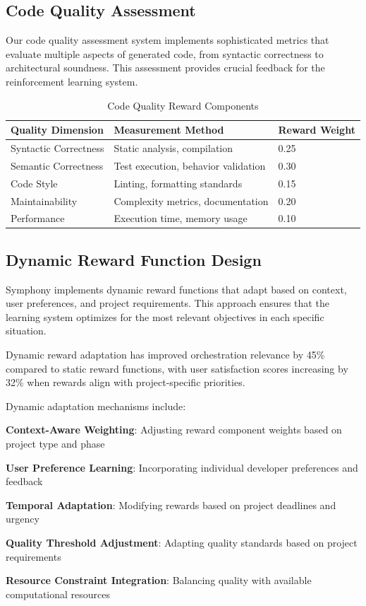 \subsection*{Code Quality Assessment}

Our code quality assessment system implements sophisticated metrics that evaluate multiple aspects of generated code, from syntactic correctness to architectural soundness. This assessment provides crucial feedback for the reinforcement learning system.

\begin{table}[ht]
\centering
\begin{tabular}{@{}lll@{}}
\toprule
\textbf{Quality Dimension} & \textbf{Measurement Method} & \textbf{Reward Weight} \\
\midrule
Syntactic Correctness & Static analysis, compilation & 0.25 \\
Semantic Correctness & Test execution, behavior validation & 0.30 \\
Code Style & Linting, formatting standards & 0.15 \\
Maintainability & Complexity metrics, documentation & 0.20 \\
Performance & Execution time, memory usage & 0.10 \\
\bottomrule
\end{tabular}
\caption{Code Quality Reward Components}
\end{table}

\subsection*{Dynamic Reward Function Design}

Symphony implements dynamic reward functions that adapt based on context, user preferences, and project requirements. This approach ensures that the learning system optimizes for the most relevant objectives in each specific situation.

\begin{alertbox}
Dynamic reward adaptation has improved orchestration relevance by 45\% compared to static reward functions, with user satisfaction scores increasing by 32\% when rewards align with project-specific priorities.
\end{alertbox}

Dynamic adaptation mechanisms include:

\begin{expandedlist}
    \item \textbf{Context-Aware Weighting}: Adjusting reward component weights based on project type and phase
    \item \textbf{User Preference Learning}: Incorporating individual developer preferences and feedback
    \item \textbf{Temporal Adaptation}: Modifying rewards based on project deadlines and urgency
    \item \textbf{Quality Threshold Adjustment}: Adapting quality standards based on project requirements
    \item \textbf{Resource Constraint Integration}: Balancing quality with available computational resources
\end{expandedlist}


